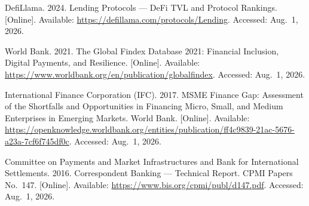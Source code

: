 \documentclass[12pt,a4paper]{report}
\begin{document}
{\begin{enumerate}[label={[\arabic*]}]
\item DefiLlama. 2024. Lending Protocols --- DeFi TVL and Protocol Rankings. [Online]. Available: \url{https://defillama.com/protocols/Lending}. Accessed: Aug.~1, 2026.

\item World Bank. 2021. The Global Findex Database 2021: Financial Inclusion, Digital Payments, and Resilience. [Online]. Available: \url{https://www.worldbank.org/en/publication/globalfindex}. Accessed: Aug.~1, 2026.




\item International Finance Corporation (IFC). 2017. MSME Finance Gap: Assessment of the Shortfalls and Opportunities in Financing Micro, Small, and Medium Enterprises in Emerging Markets. World Bank. [Online]. Available: \url{https://openknowledge.worldbank.org/entities/publication/ff4c9839-21ac-5676-a23a-7cf6f745df0c}. Accessed: Aug.~1, 2026.


\item Committee on Payments and Market Infrastructures and Bank for International Settlements. 2016. Correspondent Banking --- Technical Report. CPMI Papers No.~147. [Online]. Available: \url{https://www.bis.org/cpmi/publ/d147.pdf}. Accessed: Aug.~1, 2026.



\end{enumerate}}
\end{document}
